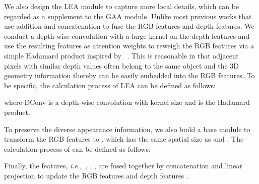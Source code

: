 \documentclass{article}
\def\ie{\emph{i.e.,~}}
\begin{document}
We also design the LEA module to capture more local details, which can be regarded as a supplement to the GAA module.
Unlike most previous works that use addition and concatenation to fuse the RGB features and depth features.
We conduct a depth-wise convolution with a large kernel on the depth features and use the resulting features as attention weights to reweigh the RGB features via a simple Hadamard product inspired by ~\citep{hou2022conv2former}.
This is reasonable in that adjacent pixels with similar depth values often belong to the same object and the 3D geometry information thereby can be easily embedded into the RGB features.
To be specific, the calculation process of LEA can be defined as follows:

where DConv is a depth-wise convolution with kernel size  and  is the Hadamard product.













To preserve the diverse appearance information, we also build a base module to transform the RGB features  to , which has the same spatial size as  and . 
The calculation process of  can be defined as follows:

Finally, the features, \ie , , , are fused together by concatenation and linear projection to update the RGB features  and depth features .
\end{document}
